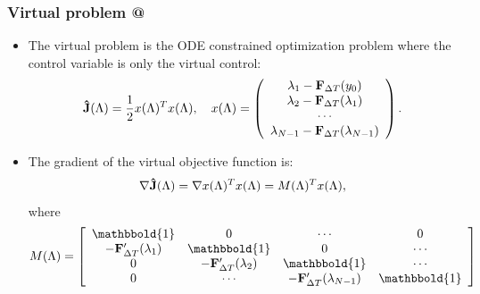 \documentclass[9pt]{beamer}
\makeatletter
\newcommand*{\rom}[1]{\expandafter\@slowromancap\romannumeral #1@}
\makeatother
\begin{document}
\begin{frame}
\frametitle{Virtual problem \rom{1}}
\begin{itemize}
\item{The virtual problem is the ODE constrained optimization problem where the control variable is only the virtual control:
{\tiny
\begin{align*}
\bold{ \hat J}(\Lambda) = \frac{1}{2} x(\Lambda)^Tx(\Lambda),\quad
x(\Lambda)=\left( \begin{array}{c}  
   \lambda_1 - \bold F_{\Delta T}(y_0) \\ 
   \lambda_2 - \bold F_{\Delta T}(\lambda_1) \\
   \cdots  \\
   \lambda_{N-1} -\bold F_{\Delta T}(\lambda_{N-1}) \\
   \end{array}  \right).
\end{align*}}}
\item{The gradient of the virtual objective function is:
{\tiny
\begin{align*}
\nabla \bold{\hat J}(\Lambda)= \nabla x(\Lambda)^T x(\Lambda) = M(\Lambda)^Tx(\Lambda),
\end{align*}}
where 
{\tiny
\begin{align*}
M(\Lambda)= \left[ \begin{array}{cccc}
   \mathbbold{1} & 0 & \cdots & 0 \\  
   -\bold{F}_{\Delta T}'(\lambda_{1}) & \mathbbold{1} & 0 & \cdots \\ 
   0 &-\bold{F}_{\Delta T}'(\lambda_{2}) & \mathbbold{1}  & \cdots \\
   0 &\cdots &-\bold{F}_{\Delta T}'(\lambda_{N-1}) & \mathbbold{1}  \\
   \end{array}  \right]
\end{align*}}}
\end{itemize}
\end{frame}
\end{document}
